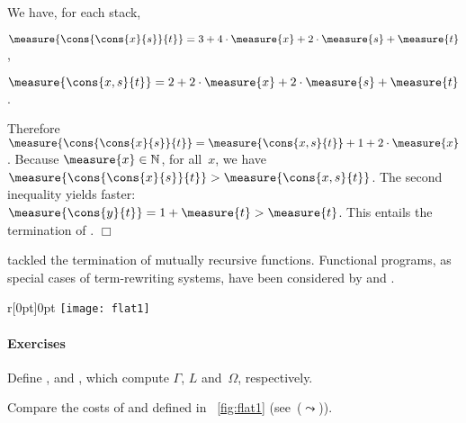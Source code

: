 We have, for each stack,
\begin{itemize*}

  \item \(\measure{\cons{\cons{x}{s}}{t}} = 3 + 4\cdot\measure{x} +
    2\cdot\measure{s} + \measure{t}\),

  \item \(\measure{\cons{x,s}{t}} = 2 + 2\cdot\measure{x} +
    2\cdot\measure{s} + \measure{t}\).

\end{itemize*}
Therefore \(\measure{\cons{\cons{x}{s}}{t}} = \measure{\cons{x,s}{t}}
+ 1 + 2\cdot\measure{x}\). Because \(\measure{x} \in \mathbb{N}\),
for all~\(x\), we have \(\measure{\cons{\cons{x}{s}}{t}} >
\measure{\cons{x,s}{t}}\). The second inequality yields faster:
\(\measure{\cons{y}{t}} = 1 + \measure{t} > \measure{t}\). This
entails the termination of
.
\hfill\(\Box\)

\cite{Giesl_1997} tackled the termination of mutually recursive
functions. Functional programs, as special cases of
term\hyp{}rewriting systems, have been considered by
\cite{Giesl_1995b} and \cite{GieslWaltherBrauburger_1998}.

%
\begin{wrapfigure}[6]{r}[0pt]{0pt}
\centering
\texttt{[image: flat1]}%
\caption{Variant flattening}
\label{fig:flat1}
\end{wrapfigure}

\paragraph{Exercises}

\begin{enumerate*}

  \item Define ,  and , which
    compute \(\Gamma\), \(L\) and~\(\Omega\), respectively.

  \item Compare the costs of  and
      defined in
    \fig~\ref{fig:flat1} (see~(\(\leadsto\))).

\end{enumerate*}
